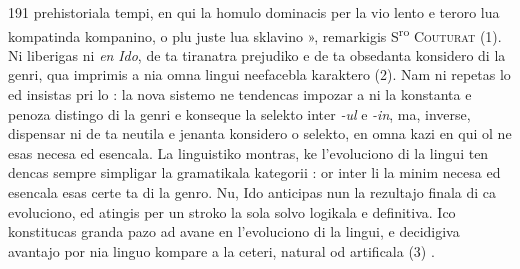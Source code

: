 \begin{VUpage}[195]{191}
\VUcontinue
prehistoriala tempi, en qui la homulo dominacis per la vio\cc
lento e teroro lua kompatinda kompanino, o plu juste lua\nl
sklavino », remarkigis S\textsuperscript{ro} \textsc{Couturat} (1). Ni liberigas ni \textit{en}\nl
\textit{Ido}, de ta tiranatra prejudiko e de ta obsedanta konsidero\nl
di la genri, qua imprimis a nia omna lingui neefacebla\nl
karaktero (2). Nam ni repetas lo ed insistas pri lo : la nova\nl
sistemo ne tendencas impozar a ni la konstanta e penoza\nl
distingo di la genri e konseque la selekto inter \textit{-ul} e \textit{-in},\nl
ma, inverse, dispensar ni de ta neutila e jenanta konsidero\nl
o selekto, en omna kazi en qui ol ne esas necesa ed esencala.\nl
La linguistiko montras, ke l'evoluciono di la lingui ten\cc
dencas sempre simpligar la gramatikala kategorii : or inter\nl
li la minim necesa ed esencala esas certe ta di la genro.\nl
Nu, Ido anticipas nun la rezultajo finala di ca evoluciono,\nl
ed atingis per un stroko la sola solvo logikala e definitiva.\nl
Ico konstitucas granda pazo ad avane en l'evoluciono di la\nl
lingui, e decidigiva avantajo por nia linguo kompare a la\nl
ceteri, natural od artificala (3) .
\end{VUpage}

